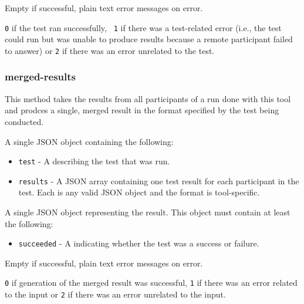 \documentclass[10pt,titlepage]{article}
\begin{document}
 Empty if successful, plain text error
messages on error.

 {\tt 0} if the test ran successfully, {\tt
  1} if there was a test-related error (i.e., the test could run but
was unable to produce results because a remote participant failed to
answer) or {\tt 2} if there was an error unrelated to the test.



\subsubsection{merged-results}

This method takes the results from all participants of a run done with
this tool and prodces a single, merged result in the format specified
by the test being conducted.

 A single JSON object containing the following:

\begin{itemize}

\item{\tt test} - A  describing the test
  that was run.

\item{\tt results} - A JSON array containing one test result for each
  participant in the test.  Each is any valid JSON object and the
  format is tool-specific.

\end{itemize}

 A single JSON object representing the
result.  This object must contain at least the following:

\begin{itemize}

\item{\tt succeeded} - A  indicating whether the
  test was a success or failure.

\end{itemize}


 Empty if successful, plain text error
messages on error.

 {\tt 0} if generation of the merged result
was successful, {\tt 1} if there was an error related to the input or
{\tt 2} if there was an error unrelated to the input.



%
%
\end{document}

